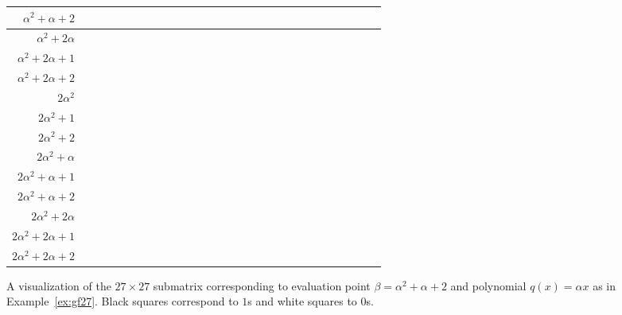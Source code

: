 \documentclass[11pt]{amsart}
\theoremstyle{definition}
\newcommand{\0}{\mathbf{0}}
\begin{document}
\begin{figure}[h]
{\begin{tabular}{r|||c|c|c||c|c|c||c|c|c|||c|c|c||c|c|c||c|c|c|||c|c|c||c|c|c||c|c|c|||}
            $\alpha^2+\alpha+2$ & & & & \cellcolor{black} & & & & & & & & & & & & & & & & & & & & & & &\\ \hline \hline
            $\alpha^2+2\alpha$ & & & & & & & & \cellcolor{black} & & & & & & & & & & & & & & & & & & & \\ \hline
            $\alpha^2+2\alpha+1$ & & & & & & & & & \cellcolor{black} & & & & & & & & & & & & & & & & & & \\ \hline
            $\alpha^2+2\alpha+2$ & & & & & & & \cellcolor{black} & & & & & & & & & & & & & & & & & & & & \\ \hline  \hline \hline
            $2\alpha^2$ & & & & & & & & & & & \cellcolor{black} & & & & & & & & & & & & & & & & \\ \hline
            $2\alpha^2+1$ & & & & & & & & & & & & \cellcolor{black} & & & & & & & & & & & & & & & \\ \hline
            $2\alpha^2+2$ & & & & & & & & & & \cellcolor{black} & & & & & & & & & & & & & & & & & \\ \hline \hline
            $2\alpha^2+\alpha$ & & & & & & & & & & & & & & \cellcolor{black} & & & & & & & & & & & & & \\ \hline
            $2\alpha^2+\alpha+1$ & & & & & & & & & & & & & & & \cellcolor{black} & & & & & & & & & & & & \\ \hline
            $2\alpha^2+\alpha+2$ & & & & & & & & & & & & & \cellcolor{black} & & & & & & & & & & & & & & \\ \hline \hline
            $2\alpha^2+2\alpha$ & & & & & & & & & & & & & & & & & \cellcolor{black} & & & & & & & & & & \\ \hline
            $2\alpha^2+2\alpha+1$ & & & & & & & & & & & & & & & & & & \cellcolor{black} & & & & & & & & & \\ \hline
            $2\alpha^2+2\alpha+2$ & & & & & & & & & & & & & & & & \cellcolor{black} & & & & & & & & & & & \\ \hline \hline \hline
        \end{tabular}}
        \caption{A visualization of the $27 \times 27$ submatrix corresponding to evaluation point $\beta = \alpha^2+\alpha+2$ and polynomial $q(x)=\alpha x$ as in Example~\ref{ex:gf27}. Black squares correspond to $1$s and white squares to $0$s.} \label{fig:gf27}
    \end{figure}
\end{document}
